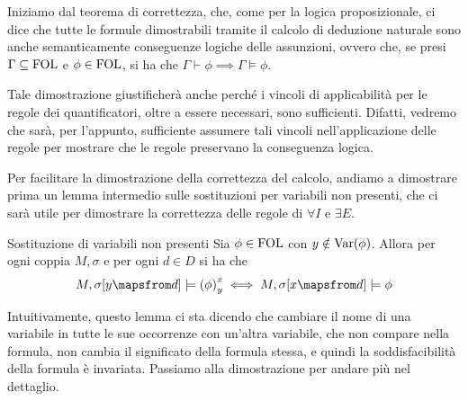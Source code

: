 Iniziamo dal teorema di correttezza, che, come per la logica proposizionale, ci dice che tutte le formule dimostrabili tramite il calcolo di deduzione naturale sono anche semanticamente conseguenze logiche delle assunzioni, ovvero che, se presi \(\Gamma\subseteq \FOL\) e \(\phi \in \FOL\), si ha che \(\Gamma \vdash \phi \implies \Gamma \models \phi\).

Tale dimostrazione giustificherà anche perché i vincoli di applicabilità per le regole dei quantificatori, oltre a essere necessari, sono sufficienti. Difatti, vedremo che sarà, per l'appunto, sufficiente assumere tali vincoli nell'applicazione delle regole per mostrare che le regole preservano la conseguenza logica.

Per facilitare la dimostrazione della correttezza del calcolo, andiamo a dimostrare prima un lemma intermedio sulle sostituzioni per variabili non presenti, che ci sarà utile per dimostrare la correttezza delle regole di \(\forall I\) e \(\exists E\).

\begin{lemma}[namedlabel={lem:subs_in_non_present_vars}{Sostituzione di variabili non presenti}]{Sostituzione di variabili non presenti}
  Sia \(\phi \in \FOL\) con \(y \notin \operatorname{Var}(\phi)\). Allora per ogni coppia \(M,\sigma\) e per ogni \(d \in D\) si ha che
  \[M,\sigma[y\mapsfrom d] \models \subs{\phi}{x}{y} \iff M,\sigma[x\mapsfrom d] \models\phi\]
\end{lemma}

Intuitivamente, questo lemma ci sta dicendo che cambiare il nome di una variabile in tutte le sue occorrenze con un'altra variabile, che non compare nella formula, non cambia il significato della formula stessa, e quindi la soddisfacibilità della formula è invariata. Passiamo alla dimostrazione per andare più nel dettaglio.

